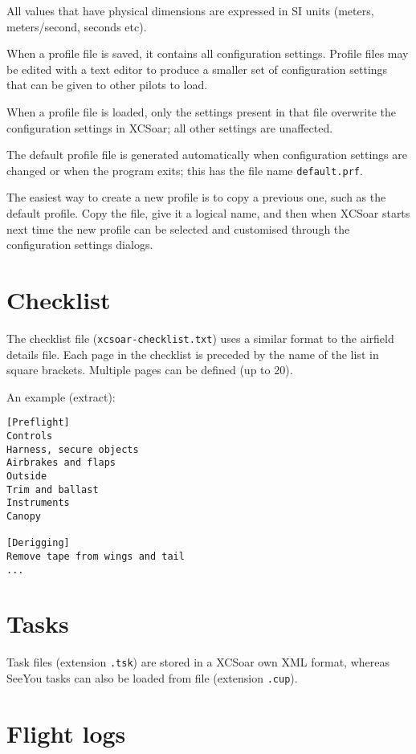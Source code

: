 All values that have physical dimensions are expressed in SI units
(meters, meters/second, seconds etc).

When a profile file is saved, it contains all configuration settings.
Profile files may be edited with a text editor to produce a smaller
set of configuration settings that can be given to other pilots to
load.  

When a profile file is loaded, only the settings present in that file
overwrite the configuration settings in XCSoar; all other settings are
unaffected.

The default profile file is generated automatically when configuration
settings are changed or when the program exits; this has the
file name \verb|default.prf|.

The easiest way to create a new profile is to copy a previous one,
such as the default profile.  Copy the file, give it a logical name,
and then when XCSoar starts next time the new profile can be selected
and customised through the configuration settings dialogs.


\section{Checklist}\label{sec:checklist-file}

The checklist file (\verb|xcsoar-checklist.txt|) uses a similar format to
the airfield details file.  Each page in the checklist is preceded by
the name of the list in square brackets.  Multiple pages can be
defined (up to 20).

An example (extract):
\begin{verbatim}
[Preflight]
Controls
Harness, secure objects
Airbrakes and flaps
Outside
Trim and ballast
Instruments
Canopy

[Derigging]
Remove tape from wings and tail
...
\end{verbatim}

\section{Tasks}

Task files (extension \verb|.tsk|) are stored in a XCSoar own XML format, 
whereas SeeYou tasks can also be loaded from file (extension \verb|.cup|).

\section{Flight logs} \label{sec:logfiles}

